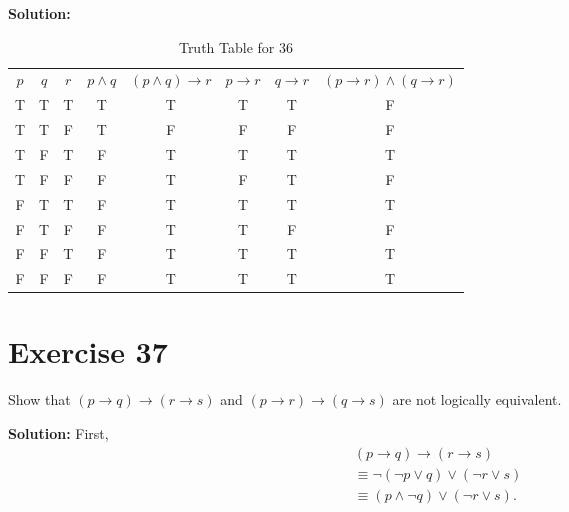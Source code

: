 \documentclass{Axon}
\begin{document}
\noindent
\textbf{Solution:}
\begin{table}[ht]
    \centering
    \begin{tabular}{c|c|c|c|c|c|c|c}
        \(p\) & \(q\) & \(r\) & \(p \land q\) & \((p \land q) \to r\) & \(p \to r\) & \(q \to r\) & \((p \to r) \land (q \to r)\) \\
        T     & T     & T     & T             & T                     & T           & T           & F                             \\
        T     & T     & F     & T             & F                     & F           & F           & F                             \\
        T     & F     & T     & F             & T                     & T           & T           & T                             \\
        T     & F     & F     & F             & T                     & F           & T           & F                             \\
        F     & T     & T     & F             & T                     & T           & T           & T                             \\
        F     & T     & F     & F             & T                     & T           & F           & F                             \\
        F     & F     & T     & F             & T                     & T           & T           & T                             \\
        F     & F     & F     & F             & T                     & T           & T           & T
    \end{tabular}
    \caption{Truth Table for 36}
\end{table}

\section*{Exercise 37}
Show that \((p \to q) \to (r \to s)\) and \((p \to r) \to (q \to s)\) are not logically equivalent.

\noindent
\textbf{Solution:}
First,
\begin{gather*}
    (p \to q) \to (r \to s)                            \\
    \equiv \lnot(\lnot p \lor q) \lor (\lnot r \lor s) \\
    \equiv (p \land \lnot q) \lor (\lnot r \lor s).    \\
\end{gather*}
\end{document}
